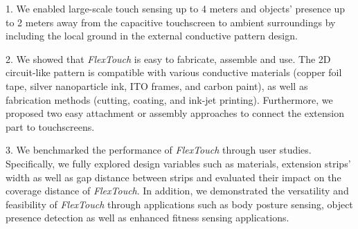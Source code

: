 1. We enabled large-scale touch sensing up to 4 meters and objects' presence up to 2 meters away from the capacitive touchscreen to ambient surroundings by including the local ground in the external conductive pattern design. 

2. We showed that \textit{FlexTouch} is easy to fabricate, assemble and use. The 2D circuit-like pattern is compatible with various conductive materials (copper foil tape, silver nanoparticle ink, ITO frames, and carbon paint), as well as fabrication methods (cutting, coating, and ink-jet printing). Furthermore, we proposed two easy attachment or assembly approaches to connect the extension part to touchscreens.  

3. We benchmarked the performance of \textit{FlexTouch} through user studies. Specifically, we fully explored design variables such as materials, extension strips' width as well as gap distance between strips and evaluated their impact on the coverage distance of \textit{FlexTouch}. In addition, we demonstrated the versatility and feasibility of \textit{FlexTouch} through applications such as body posture sensing, object presence detection as well as enhanced fitness sensing applications.
